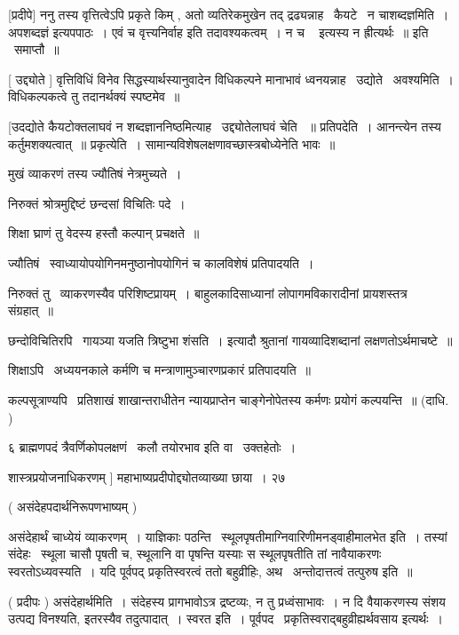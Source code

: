 \documentclass[11pt, openany]{book}
\begin{document}
 [प्रदीपे] ननु तस्य वृत्तित्वेऽपि प्रकृते किम् , अतो व्यतिरेकमुखेन
तद् द्रढ्यन्नाह \textendash\ कैयटे \textendash\ न चाशब्दज्ञमिति~। {\qt अपशब्दज्ञं इत्यपपाठः~।} एवं च
वृत्त्यनिर्वाह इति तदावश्यकत्वम्~। {\qt न च \textendash\ } इत्यस्य न ह्रीत्यर्थः~॥
इति \textendash\ समाप्तौ~॥ 

 [ उद्द्योते ] वृत्तिविधिं विनेव सिद्धस्यार्थस्यानुवादेन विधिकल्पने
मानाभावं ध्वनयन्नाह \textendash\ उद्योते \textendash\ अवश्यमिति~। विधिकल्पकत्वे तु तदानर्थक्यं
स्पष्टमेव~॥ 

 [उदद्योते कैयटोक्तलाघवं न शब्दज्ञाननिष्ठमित्याह \textendash\ उद्द्योतेलाघवं चेति
~॥ प्रतिपदेति~। आनन्त्येन तस्य कर्तुमशक्यत्वात्~॥ प्रकृत्येति~। 
सामान्यविशेषलक्षणावच्छास्त्रबोध्येनेति भावः~॥ 



मुखं व्याकरणं तस्य ज्यौतिषं नेत्रमुच्यते~। 

निरुक्तं श्रोत्रमुद्दिष्टं छन्दसां विचितिः पदे~। 

शिक्षा घ्राणं तु वेदस्य हस्तौ कल्पान् प्रचक्षते~॥ 

 ज्यौतिषं \textendash\ स्वाध्यायोपयोगिनमनुष्ठानोपयोगिनं च कालविशेषं प्रतिपादयति~। 


 निरुक्तं तु \textendash\ व्याकरणस्यैव परिशिष्टप्रायम्~। बाहुलकादिसाध्यानां
लोपागमविकारादीनां प्रायशस्तत्र संग्रहात्~॥ 

 छन्दोविचितिरपि \textendash\ {\qt गायञ्या यजति त्रिष्टुभा शंसति~।} इत्यादौ श्रुतानां
गायव्यादिशब्दानां लक्षणतोऽर्थमाचष्टे~॥ 

 शिक्षाऽपि \textendash\ अध्ययनकाले कर्मणि च मन्त्राणामुञ्चारणप्रकारं
प्रतिपादयति~॥

 कल्पसूत्राण्यपि \textendash\ प्रतिशाखं शाखान्तराधीतेन न्यायप्राप्तेन
चाङ्गेनोपेतस्य कर्मणः प्रयोगं कल्पयन्ति~॥ (दाधि. ) 

६ ब्राह्मणपदं त्रैवर्णिकोपलक्षणं \textendash\ कलौ तयोरभाव इति वा \textendash\ उक्तहेतोः~। 

शास्त्रप्रयोजनाधिकरणम् ] महाभाष्यप्रदीपोद्द्योतव्याख्या छाया~। २७ 



 ( असंदेहपदार्थनिरूपणभाष्यम् ) 

 असंदेहार्थं चाध्येयं व्याकरणम्~। याज्ञिकाः पठन्ति \textendash\ 
स्थूलपृषतीमाग्निवारिणीमनड्वाहीमालभेत इति~। तस्यां संदेहः \textendash\ स्थूला चासौ
पृषती च, स्थूलानि वा पृषन्ति यस्याः स स्थूलपृषतीति तां नावैयाकरणः
स्वरतोऽध्यवस्यति~। यदि पूर्वपद् प्रकृतिस्वरत्वं ततो बहुव्रीहिः,
अथ \textendash\ अन्तोदात्तत्वं तत्पुरुष इति~॥ 

 ( प्रदीपः ) असंदेहार्थमिति~। संदेहस्य प्रागभावोऽत्र द्रष्टव्यः, न
तु प्रध्वंसाभावः~। न दि वैयाकरणस्य संशय उत्पद्य विनश्यति, इतरस्यैव
तदुत्पादात्~। स्वरत इति~। पूर्वपद \textendash\ प्रकृतिस्वराद्बहुव्रीह्यर्थवसाय
इत्यर्थः~। 
\end{document}
